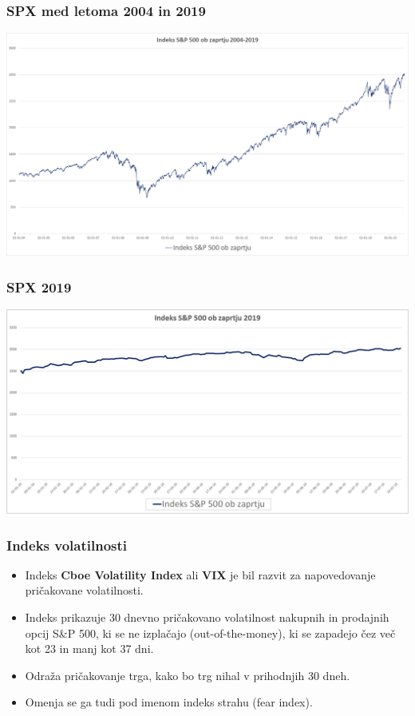 \documentclass[10pt]{beamer}
\begin{document}
\begin{frame}
\frametitle{SPX med letoma 2004 in 2019}
\includegraphics[width=1\textwidth]{./Grafi/SPX 2004-2019.png}
\end{frame}

\begin{frame}
\frametitle{SPX 2019}
\includegraphics[width=1\textwidth]{./Grafi/SPX 2019.png}
\end{frame}

\begin{frame}
\frametitle{Indeks volatilnosti}
\begin{itemize}
\item Indeks \textbf{Cboe Volatility Index} ali \textbf{VIX} je bil razvit za napovedovanje pričakovane volatilnosti.
\item Indeks prikazuje 30 dnevno pričakovano volatilnost nakupnih in prodajnih opcij S\&P 500, ki se ne izplačajo (out-of-the-money), ki se zapadejo čez več kot 23 in manj kot 37 dni. 
\item Odraža pričakovanje trga, kako bo trg nihal v prihodnjih 30 dneh.
\item Omenja se ga tudi pod imenom indeks strahu (fear index).
\end{itemize}
\end{frame}
\end{document}

